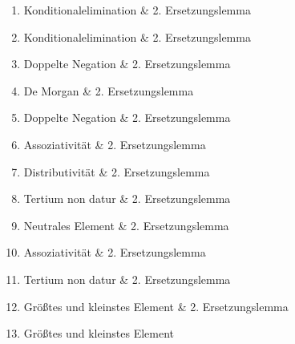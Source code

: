 \documentclass[12pt,a4paper]{scrartcl}
\begin{document}
\begin{enumerate} 
  \item Konditionalelimination \& 2. Ersetzungslemma
  \item Konditionalelimination \& 2. Ersetzungslemma
  \item Doppelte Negation \& 2. Ersetzungslemma
  \item De Morgan \& 2. Ersetzungslemma
  \item Doppelte Negation \& 2. Ersetzungslemma
  \item Assoziativität \& 2. Ersetzungslemma
  \item Distributivität \& 2. Ersetzungslemma
  \item Tertium non datur \& 2. Ersetzungslemma
  \item Neutrales Element \& 2. Ersetzungslemma
  \item Assoziativität \& 2. Ersetzungslemma
  \item Tertium non datur \& 2. Ersetzungslemma
  \item Größtes und kleinstes Element \& 2. Ersetzungslemma
  \item Größtes und kleinstes Element
\end{enumerate}
\clearpage
\setcounter{equation}{-1}
\end{document}

